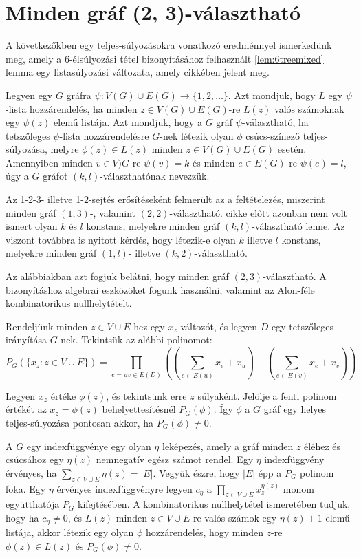 \documentclass[12pt, a4paper]{report}
\theoremstyle{remark}
\theoremstyle{definition}
\begin{document}
\section{Minden gráf (2, 3)-választható}
A következőkben egy teljes-súlyozásokra vonatkozó eredménnyel ismerkedünk meg, amely a $6$-élsúlyozási tétel bizonyításához felhasznált \ref{lem:6treemixed} lemma egy listasúlyozási változata, amely \citeauthor{Wong2014} \cite{Wong2014} cikkében jelent meg. 

Legyen egy $G$ gráfra $\psi: V(G) \cup E(G) \rightarrow \lbrace 1, 2, \ldots \rbrace$. Azt mondjuk, hogy $L$ egy $\psi$-lista hozzárendelés, ha minden $z \in V(G) \cup E(G)$-re $L(z)$ valós számoknak egy $\psi(z)$ elemű listája. Azt mondjuk, hogy a $G$ gráf $\psi$-választható, ha tetszőleges $\psi$-lista hozzárendelésre $G$-nek létezik olyan $\phi$ csúcs-színező teljes-súlyozása, melyre $\phi(z) \in L(z)$ minden $z \in V(G) \cup E(G)$ esetén. Amennyiben minden $v \in V)G$-re $\psi(v) = k$ és minden $e \in E(G)$-re $\psi(e) = l$, úgy a $G$ gráfot $(k, l)$-választhatónak nevezzük. 

Az 1-2-3- illetve 1-2-sejtés erősítéseként felmerült az a feltételezés, miszerint minden gráf $(1, 3)$-, valamint $(2, 2)$-választható. \citeauthor{Wong2014} cikke előtt azonban nem volt ismert olyan $k$ és $l$ konstans, melyekre minden gráf $(k, l)$-választható lenne. Az viszont továbbra is nyitott kérdés, hogy létezik-e olyan $k$ illetve $l$ konstans, melyekre minden gráf $(1, l)$- illetve $(k, 2)$-választható.

Az alábbiakban azt fogjuk belátni, hogy minden gráf $(2, 3)$-választható. A bizonyításhoz algebrai eszközöket fogunk használni, valamint az Alon-féle kombinatorikus nullhelytételt.

Rendeljünk minden $z \in V \cup E$-hez egy $x_z$ változót, és legyen $D$ egy tetszőleges irányítása $G$-nek. Tekintsük az alábbi polinomot:
\begin{equation}
P_G(\lbrace x_z: z \in V \cup E \rbrace) = \prod_{e = uv \in E(D)} \left( \left( \sum_{e \in E(u)} x_e + x_u \right) - \left( \sum_{e \in E(v)} x_e + x_v \right) \right)
\end{equation}

Legyen $x_z$ értéke $\phi(z)$, és tekintsünk erre $z$ súlyaként. Jelölje a fenti polinom értékét az $x_z = \phi(z)$ behelyettesítésnél $P_G(\phi)$. Így $\phi$ a $G$ gráf egy helyes teljes-súlyozása pontosan akkor, ha $P_G(\phi) \neq 0$.

A $G$ egy indexfüggvénye egy olyan $\eta$ leképezés, amely a gráf minden $z$ éléhez és csúcsához egy $\eta(z)$ nemnegatív egész számot rendel. Egy $\eta$ indexfüggvény érvényes, ha $\sum\limits_{z \in V \cup E} \eta(z) = |E|$. Vegyük észre, hogy $|E|$ épp a $P_G$ polinom foka. Egy $\eta$ érvényes indexfüggvényre legyen $c_\eta$ a $\prod\limits_{z \in V \cup E} x_z^{\eta(z)} $ monom együtthatója $P_G$ kifejtésében. A kombinatorikus nullhelytétel ismeretében tudjuk, hogy ha $c_\eta \neq 0$, és $L(z)$ minden $z \in V \cup E$-re valós számok egy $\eta(z) + 1$ elemű listája, akkor létezik egy olyan $\phi$ hozzárendelés, hogy minden $z$-re $\phi(z) \in L(z)$ és $P_G(\phi) \neq 0$.
\end{document}
